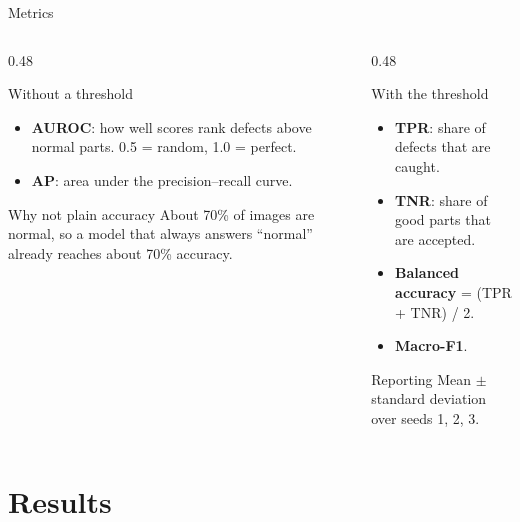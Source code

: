 \documentclass[aspectratio=169,10pt]{beamer}
\begin{document}
\begin{frame}{Metrics}
  \begin{columns}[T]
    \begin{column}{0.48\textwidth}
      \begin{block}{Without a threshold}
        \begin{itemize}
          \item \textbf{AUROC}: how well scores rank defects above normal parts.
                0.5 = random, 1.0 = perfect.
          \item \textbf{AP}: area under the precision--recall curve.
        \end{itemize}
      \end{block}
      \begin{block}{Why not plain accuracy}
        About 70\% of images are normal, so a model that always answers
        ``normal'' already reaches about 70\% accuracy.
      \end{block}
    \end{column}
    \begin{column}{0.48\textwidth}
      \begin{block}{With the threshold}
        \begin{itemize}
          \item \textbf{TPR}: share of defects that are caught.
          \item \textbf{TNR}: share of good parts that are accepted.
          \item \textbf{Balanced accuracy} = (TPR + TNR) / 2.
          \item \textbf{Macro-F1}.
        \end{itemize}
      \end{block}
      \begin{alertblock}{Reporting}
        Mean $\pm$ standard deviation over seeds 1, 2, 3.
      \end{alertblock}
    \end{column}
  \end{columns}
\end{frame}

\section{Results}
\end{document}
